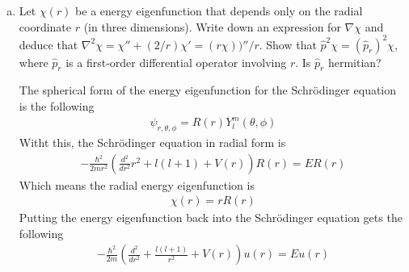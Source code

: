 \documentclass[10pt,letterpaper]{article}
\begin{document}
\begin{enumerate}
\begin{enumerate}[a)]
\item Let $\chi(r)$ be a energy eigenfunction that depends only on the radial coordinate $r$ (in three dimensions). Write down an expression for $\nabla\chi$ and deduce that $\nabla^{2}\chi = \chi'' + (2/r)\chi' = (r\chi))''/r$. Show that $\hat{p}^{2}\chi = (\hat{p}_{r})^{2}\chi$, where $\hat{p}_{r}$ is a first-order differential operator involving $r$. Is $\hat{p}_{r}$ hermitian?

\color{violet}
The spherical form of the energy eigenfunction for the Schrödinger equation is the following
\begin{gather*}
\psi_{r, \theta, \phi} = R(r)Y_{l}^{m}(\theta, \phi)
\end{gather*}
Witht this, the Schrödinger equation in radial form is 
\begin{gather*}
-\frac{\hbar^{2}}{2mr^{2}} \left( \frac{d^{2}}{dr^{2}} r^{2} + l(l + 1) + V(r) \right)R(r) = ER(r)
\end{gather*}
Which means the radial energy eigenfunction is 
\begin{gather*}
\chi(r) = rR(r)
\end{gather*}
Putting the energy eigenfunction back into the Schrödinger equation gets the following
\begin{gather*}
-\frac{\hbar^{2}}{2m}\left( \frac{d^{2}}{dr^{2}} + \frac{l(l + 1)}{r^{2}} + V(r) \right)u(r) = Eu(r)
\end{gather*}
\color{black}

\end{enumerate}

\end{enumerate}
\end{document}

